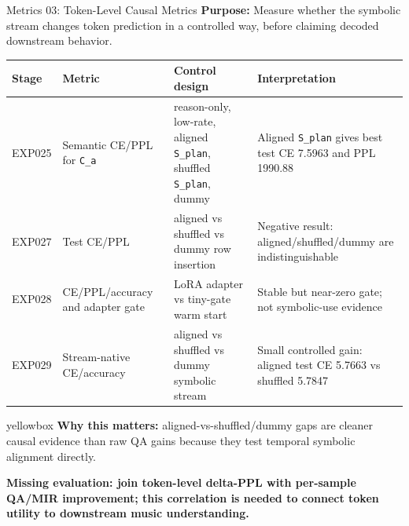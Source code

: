 \documentclass[aspectratio=169,11pt]{beamer}
\newcommand{\missing}[1]{{\color{missingred}\textbf{#1}}}
\newcommand{\code}[1]{\texttt{\footnotesize #1}}
\newcommand{\expfield}[2]{\textbf{#1:} #2\par\vspace{0.10cm}}
\newenvironment{keybox}{%
  \begin{beamercolorbox}[rounded=true,sep=0.14cm,wd=\linewidth]{yellowbox}\footnotesize%
}{%
  \end{beamercolorbox}%
}
\begin{document}
\begin{frame}{Metrics 03: Token-Level Causal Metrics}
  \footnotesize
  \expfield{Purpose}{Measure whether the symbolic stream changes token prediction in a controlled way, before claiming decoded downstream behavior.}

  \begin{tabularx}{\linewidth}{p{1.55cm}p{2.75cm}Yp{3.1cm}}
    \toprule
    Stage & Metric & Control design & Interpretation \\
    \midrule
    EXP025 & Semantic CE/PPL for \code{C\_a} & reason-only, low-rate, aligned \code{S\_plan}, shuffled \code{S\_plan}, dummy & Aligned \code{S\_plan} gives best test CE 7.5963 and PPL 1990.88 \\
    EXP027 & Test CE/PPL & aligned vs shuffled vs dummy row insertion & Negative result: aligned/shuffled/dummy are indistinguishable \\
    EXP028 & CE/PPL/accuracy and adapter gate & LoRA adapter vs tiny-gate warm start & Stable but near-zero gate; not symbolic-use evidence \\
    EXP029 & Stream-native CE/accuracy & aligned vs shuffled vs dummy symbolic stream & Small controlled gain: aligned test CE 5.7663 vs shuffled 5.7847 \\
    \bottomrule
  \end{tabularx}

  \vspace{0.18cm}
  \begin{keybox}\textbf{Why this matters:} aligned-vs-shuffled/dummy gaps are cleaner causal evidence than raw QA gains because they test temporal symbolic alignment directly.\end{keybox}
  \vspace{0.18cm}
  \missing{Missing evaluation: join token-level delta-PPL with per-sample QA/MIR improvement; this correlation is needed to connect token utility to downstream music understanding.}
\end{frame}
\end{document}
